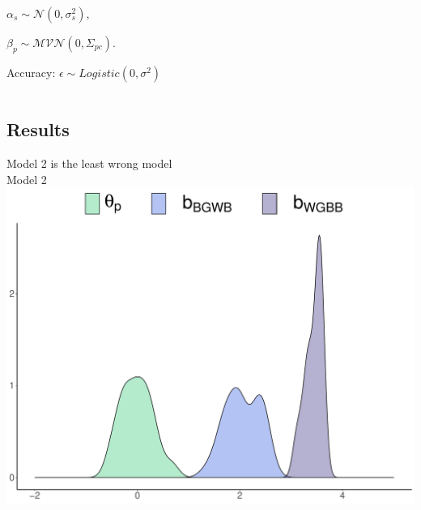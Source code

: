 \documentclass[compress]{beamer}
\begin{document}
\begin{frame}
	\begin{centering}
		$\alpha_s \sim \mathcal{N}(0, \sigma_s^2)$,
		
	\end{centering}
	
	\begin{centering}
		
		$\beta_p \sim \mathcal{MVN}(0, \Sigma_{pc})$.
		
	\end{centering}
	
	
	\vspace{1.5mm}
	
	\footnotesize{Accuracy: $\epsilon \sim Logistic (0, \sigma^2)$}
	
		\vspace{1.5mm}
\pause
\begin{columns}[T]
	\begin{column}{.50\linewidth}
		\centering
		
		
	\end{column}
		\begin{column}{.50\linewidth}
				\centering
	
	\end{column}
\end{columns}
\end{frame}

\subsection{Results}

\begin{frame}{Model 2 is the least wrong model}
		{\centering{\color{rasch}{Rasch model:}} \\ \small{Model 2} \\}
	\centering
	\includegraphics[width=0.8\linewidth]{img/raceParaccuracy.pdf}
\end{frame}
\end{document}
